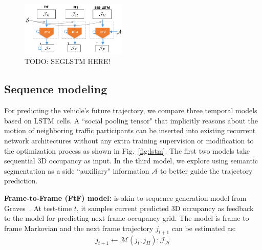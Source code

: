 \documentclass[10pt,twocolumn,letterpaper]{article}
\begin{document}
\begin{figure}[t]
        \centering
        \includegraphics[width=0.45\textwidth]{figures/network_detail.pdf}
        \caption{
        \small{TODO: SEGLSTM HERE!}
        }
        \label{fig:SEGLSTM}
\end{figure}
\subsection{Sequence modeling}

For predicting the vehicle's future trajectory, we compare three temporal models based on LSTM cells. A ``social pooling tensor" that implicitly reasons about the motion of neighboring traffic participants can be inserted into existing recurrent network architectures without any extra training supervision or modification to the optimization process as shown in Fig.~\ref{fig:lstm}. The first two models take sequential 3D occupancy as input. In the third model, we  explore using semantic segmentation as a side ``auxiliary" information $\mathcal{A}$ to better guide the trajectory prediction.

\vspace{\baselineskip}
\noindent \textbf{Frame-to-Frame (FtF) model:}
is akin to  sequence generation model from Graves~\cite{graves2013generating}.  At test-time $t$, it samples current predicted 3D occupancy as feedback to the model for predicting next frame occupancy grid. The model is frame to frame Markovian and the next frame trajectory $j_{t+1}$ can be estimated as:
\begin{equation}
j_{t+1} \leftarrow  \bm{\mathcal{M}}(j_t, j_H): \mathcal{J_H}
\label{eq:FtF}
\end{equation}
\end{document}
